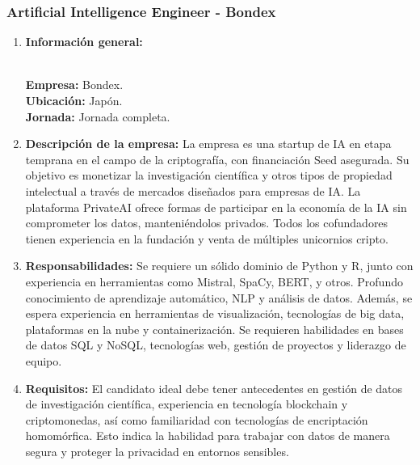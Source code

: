 \documentclass[12pt]{article}
\begin{document}
            \subsubsection{Artificial Intelligence Engineer - Bondex}
                \begin{enumerate}
                    \item \textbf{Información general:}
                    
                        \textbf{\\Empresa:} Bondex.
                        \textbf{\\Ubicación:} Japón.
                        \textbf{\\Jornada:} Jornada completa.

                    \item \textbf{Descripción de la empresa:}
                        La empresa es una startup de IA en etapa temprana en el campo de la criptografía, con financiación Seed asegurada. Su objetivo es monetizar la investigación científica y otros tipos de propiedad intelectual a través de mercados diseñados para empresas de IA. La plataforma PrivateAI ofrece formas de participar en la economía de la IA sin comprometer los datos, manteniéndolos privados. Todos los cofundadores tienen experiencia en la fundación y venta de múltiples unicornios cripto.

                    \item \textbf{Responsabilidades:}
                        Se requiere un sólido dominio de Python y R, junto con experiencia en herramientas como Mistral, SpaCy, BERT, y otros. Profundo conocimiento de aprendizaje automático, NLP y análisis de datos. Además, se espera experiencia en herramientas de visualización, tecnologías de big data, plataformas en la nube y containerización. Se requieren habilidades en bases de datos SQL y NoSQL, tecnologías web, gestión de proyectos y liderazgo de equipo.

                    \item \textbf{Requisitos:}
                        El candidato ideal debe tener antecedentes en gestión de datos de investigación científica, experiencia en tecnología blockchain y criptomonedas, así como familiaridad con tecnologías de encriptación homomórfica. Esto indica la habilidad para trabajar con datos de manera segura y proteger la privacidad en entornos sensibles.

                \end{enumerate}
\end{document}
